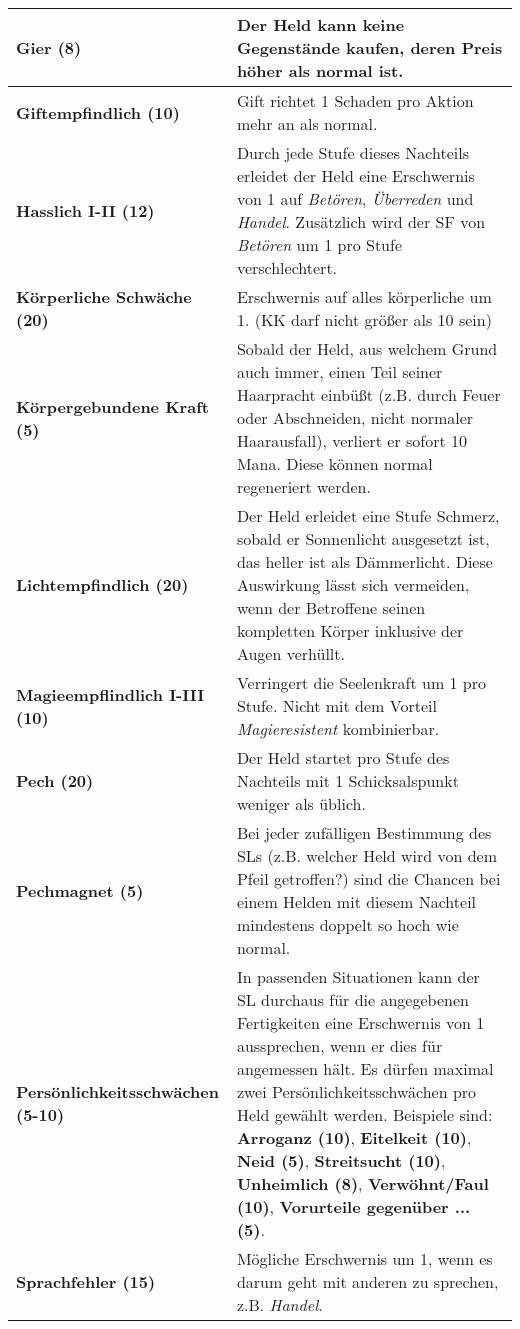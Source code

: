 \begin{longtable}{|p{5cm}|p{11cm}|}
\textbf{Gier (8)} & Der Held kann keine Gegenstände kaufen, deren Preis höher als normal ist. \\ \hline

\textbf{Giftempfindlich (10)} & Gift richtet 1 Schaden pro Aktion mehr an als normal. \\ \hline

\textbf{Hasslich I-II (12)} & Durch jede Stufe dieses Nachteils erleidet der Held eine Erschwernis von 1 auf \textit{Betören}, \textit{Überreden} und \textit{Handel}. Zusätzlich wird der SF von \textit{Betören} um 1 pro Stufe verschlechtert. \\ \hline

\textbf{Körperliche Schwäche (20)} & Erschwernis auf alles körperliche um 1. (KK darf nicht größer als 10 sein) \\ \hline

\textbf{Körpergebundene Kraft (5)} & Sobald der Held, aus welchem Grund auch immer, einen Teil seiner Haarpracht einbüßt (z.B. durch Feuer oder Abschneiden, nicht normaler Haarausfall), verliert er sofort 10 Mana. Diese können normal regeneriert werden. \\ \hline

\textbf{Lichtempfindlich (20)} & Der Held erleidet eine Stufe Schmerz, sobald er Sonnenlicht ausgesetzt ist, das heller ist als Dämmerlicht. Diese Auswirkung lässt sich vermeiden, wenn der Betroffene seinen kompletten Körper inklusive der Augen verhüllt. \\ \hline

\textbf{Magieempflindlich I-III (10)} & Verringert die Seelenkraft um 1 pro Stufe. Nicht mit dem Vorteil \textit{Magieresistent} kombinierbar. \\ \hline

\textbf{Pech (20)} & Der Held startet pro Stufe des Nachteils mit 1 Schicksalspunkt weniger als üblich. \\ \hline

\textbf{Pechmagnet (5)} & Bei jeder zufälligen Bestimmung des SLs (z.B. welcher Held wird von dem Pfeil getroffen?) sind die Chancen bei einem Helden mit diesem Nachteil mindestens doppelt so hoch wie normal. \\ \hline

\textbf{Persönlichkeitsschwächen (5-10)} & In passenden Situationen kann der SL durchaus für die angegebenen Fertigkeiten eine Erschwernis von 1 aussprechen, wenn er dies für angemessen hält. Es dürfen maximal zwei Persönlichkeitsschwächen pro Held gewählt werden. Beispiele sind: \textbf{Arroganz (10)}, \textbf{Eitelkeit (10)}, \textbf{Neid (5)}, \textbf{Streitsucht (10)}, \textbf{Unheimlich (8)}, \textbf{Verwöhnt/Faul (10)}, \textbf{Vorurteile gegenüber ... (5)}. \\ \hline
\textbf{Sprachfehler (15)} & Mögliche Erschwernis um 1, wenn es darum geht mit anderen zu sprechen, z.B. \textit{Handel}. \\ \hline


\end{longtable}
